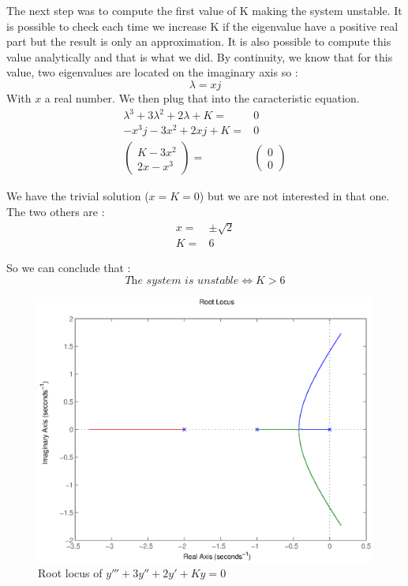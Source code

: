 The next step was to compute the first value of K making the system unstable. It is possible to check each time we increase K if the eigenvalue have a positive real part but the result is only an approximation. It is also possible to compute this value analytically and that is what we did. By continuity, we know that for this value, two eigenvalues are located on the imaginary axis so :
$$\lambda = xj$$
With $x$ a real number. We then plug that into the caracteristic equation.
\begin{eqnarray*}
\lambda ^3+3\lambda ^2+2\lambda +K=&0\\
-x^3j-3x^2+2xj+K=&0\\
\left(\begin{array}{c}
K-3x^2 \\ 
2x-x^3
\end{array} \right) =& \left( \begin{array}{c}
0 \\ 
0
\end{array} \right)
\end{eqnarray*}

We have the trivial solution ($x=K=0$) but we are not interested in that one. The two others are :
\begin{eqnarray*}
x =& \pm \sqrt{2}\\
K =& 6
\end{eqnarray*}

So we can conclude that :
$$\textit{The system is unstable} \iff K>6$$

\begin{figure}
\begin{center}
\includegraphics[scale=0.5]{rloc.eps}
\caption{Root locus of $y'''+3y''+2y'+Ky=0$}
\label{rloc}
\end{center}
\end{figure}


